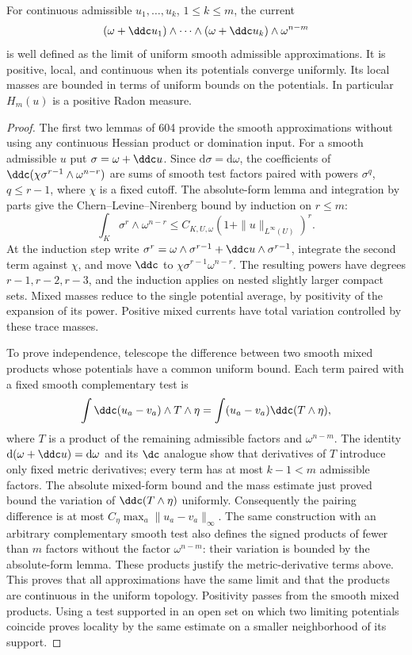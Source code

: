 \begin{proposition}\label{draft:605-continuous-products}
For continuous admissible $u_1,\ldots,u_k$, $1\leq k\leq m$, the current
\[
 (\omega+\ddc u_1)\wedge\cdots\wedge(\omega+\ddc u_k)
                                          \wedge\omega^{n-m}
\]
is well defined as the limit of uniform smooth admissible approximations.
It is positive, local, and continuous when its potentials converge
uniformly. Its local masses are bounded in terms of uniform bounds on
the potentials. In particular $H_m(u)$ is a positive Radon measure.
\end{proposition}
\begin{proof}
The first two lemmas of 604 provide the smooth approximations without
using any continuous Hessian product or domination input.
For a smooth admissible $u$ put $\sigma=\omega+\ddc u$.
Since $\mathrm d\sigma=\mathrm d\omega$, the coefficients of
$\ddc(\chi\sigma^{r-1}\wedge\omega^{n-r})$ are sums of smooth test
factors paired with powers $\sigma^q$, $q\leq r-1$, where $\chi$ is a
fixed cutoff. The absolute-form lemma and integration by parts give
the Chern--Levine--Nirenberg bound by induction on $r\leq m$:
\[
 \int_K\sigma^r\wedge\omega^{n-r}
                     \leq C_{K,U,\omega}(1+\|u\|_{L^\infty(U)})^r.
\]
At the induction step write $\sigma^r=\omega\wedge\sigma^{r-1}
+\ddc u\wedge\sigma^{r-1}$, integrate the second term against $\chi$,
and move $\ddc$ to $\chi\sigma^{r-1}\omega^{n-r}$.
The resulting powers have degrees $r-1,r-2,r-3$, and the induction
applies on nested slightly larger compact sets. Mixed masses reduce to
the single potential average, by positivity of the expansion of its
power. Positive mixed currents have total variation controlled by these
trace masses.

To prove independence, telescope the difference between two smooth
mixed products whose potentials have a common uniform bound. Each term
paired with a fixed smooth complementary test is
\[
 \int\ddc(u_a-v_a)\wedge T\wedge\eta
                         =\int(u_a-v_a)\ddc(T\wedge\eta),
\]
where $T$ is a product of the remaining admissible factors and
$\omega^{n-m}$. The identity $\mathrm d(\omega+\ddc u)=\mathrm d\omega$
and its $\dc$ analogue show that derivatives of $T$ introduce only
fixed metric derivatives; every term has at most $k-1<m$ admissible
factors. The absolute mixed-form bound and the mass estimate just
proved bound the variation of $\ddc(T\wedge\eta)$ uniformly.
Consequently the pairing difference is at most
$C_\eta\max_a\|u_a-v_a\|_\infty$.
The same construction with an arbitrary complementary smooth test
also defines the signed products of fewer than $m$ factors without the
factor $\omega^{n-m}$: their variation is bounded by the absolute-form
lemma. These products justify the metric-derivative terms above.
This proves that all approximations have the same limit and that the
products are continuous in the uniform topology. Positivity passes
from the smooth mixed products. Using a test supported in an open set
on which two limiting potentials coincide proves locality by the same
estimate on a smaller neighborhood of its support.
\end{proof}

